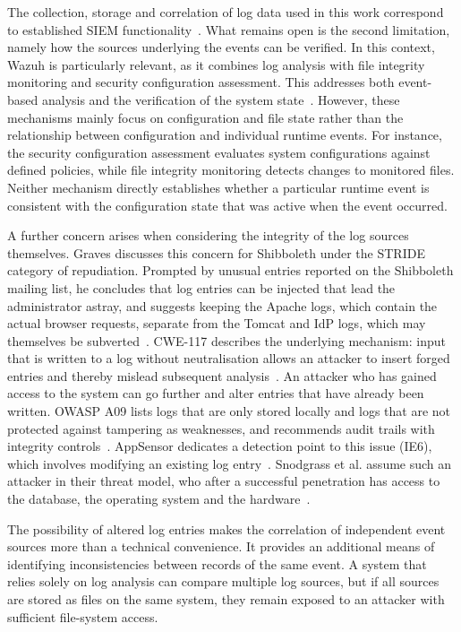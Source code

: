 \documentclass[../main.tex]{subfiles}
\begin{document}
The collection, storage and correlation of log data used in this work correspond to established 
SIEM functionality~\cite{NIST80092}. 
What remains open is the second limitation, namely how the sources underlying the events can be 
verified. 
In this context, Wazuh is particularly relevant, as it combines log analysis with file integrity
monitoring and security configuration assessment. 
This addresses both event-based analysis and the verification of the system state~\cite{WazuhDocumentation}. 
However, these mechanisms mainly focus on configuration and file state rather than the relationship 
between configuration and individual runtime events. 
For instance, the security configuration assessment evaluates system configurations against defined 
policies, while file integrity monitoring detects changes to monitored files. 
Neither mechanism directly establishes whether a particular runtime event is consistent with the 
configuration state that was active when the event occurred. 

A further concern arises when considering the integrity of the log sources themselves. 
Graves discusses this concern for Shibboleth under the STRIDE category of repudiation. 
Prompted by unusual entries reported on the Shibboleth mailing list, he concludes that log entries 
can be injected that lead the administrator astray, and suggests keeping the Apache logs, which 
contain the actual browser requests, separate from the Tomcat and IdP logs, which may themselves 
be subverted~\cite{ShibbolethGIAC}. 
CWE-117 describes the underlying mechanism: input that is written to a log without neutralisation 
allows an attacker to insert forged entries and thereby mislead subsequent analysis~\cite{CWE117}. 
An attacker who has gained access to the system can go further and alter entries that have already 
been written. 
OWASP A09 lists logs that are only stored locally and logs that are not protected against 
tampering as weaknesses, and recommends audit trails with integrity controls~\cite{OWASPA09}. 
AppSensor dedicates a detection point to this issue (IE6), which involves modifying an existing 
log entry~\cite{OWASPAppSensor}. 
Snodgrass et al. assume such an attacker in their threat model, who after a successful penetration 
has access to the database, the operating system and the hardware~\cite{TamperDetection}. 

The possibility of altered log entries makes the correlation of independent event sources more than 
a technical convenience. 
It provides an additional means of identifying inconsistencies between records of the same event. 
A system that relies solely on log analysis can compare multiple log sources, but if all sources 
are stored as files on the same system, they remain exposed to an attacker with sufficient 
file-system access.
\end{document}
